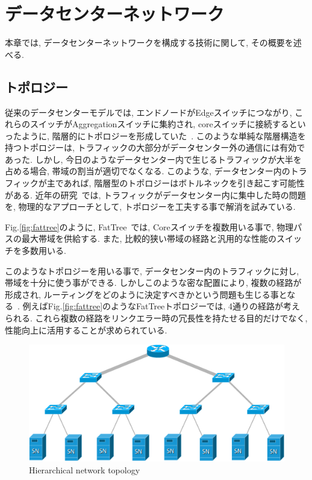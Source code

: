 \chapter{データセンターネットワーク}
\label{chapter:datacenter_network}
本章では, データセンターネットワークを構成する技術に関して, その概要を述べる.

\section{トポロジー}
従来のデータセンターモデルでは, エンドノードがEdgeスイッチにつながり,
これらのスイッチがAggregationスイッチに集約され,
coreスイッチに接続するといったように, 階層的にトポロジーを形成していた~\cite{fattree}.
このような単純な階層構造を持つトポロジーは, トラフィックの大部分がデータセンター外の通信には有効であった.
しかし, 今日のようなデータセンター内で生じるトラフィックが大半を占める場合, 帯域の割当が適切でなくなる.
このような, データセンター内のトラフィックが主であれば, 階層型のトポロジーはボトルネックを引き起こす可能性がある.
近年の研究~\cite{fattree,bcube,vl2}では, トラフィックがデータセンター内に集中した時の問題を, 物理的なアプローチとして,
トポロジーを工夫する事で解消を試みている.

Fig.\ref{fig:fattree}のように, FatTree~\cite{fattree}では, Coreスイッチを複数用いる事で,
物理パスの最大帯域を供給する.
また, 比較的狭い帯域の経路と汎用的な性能のスイッチを多数用いる.

このようなトポロジーを用いる事で, データセンター内のトラフィックに対し, 帯域を十分に使う事ができる.
しかしこのような密な配置により, 複数の経路が形成され, ルーティングをどのように決定すべきかという問題も生じる事となる~\cite{improving}.
例えばFig.\ref{fig:fattree}のようなFatTreeトポロジーでは, 4通りの経路が考えられる.
これら複数の経路をリンクエラー時の冗長性を持たせる目的だけでなく, 性能向上に活用することが求められている.

\begin{figure}[h]
    \begin{center}
    \includegraphics[autoebb, width=350pt]{./img/hierarchy_topology.pdf}
    \caption{Hierarchical network topology}
    \label{fig:hierarchical}
    \end{center}
\end{figure}


